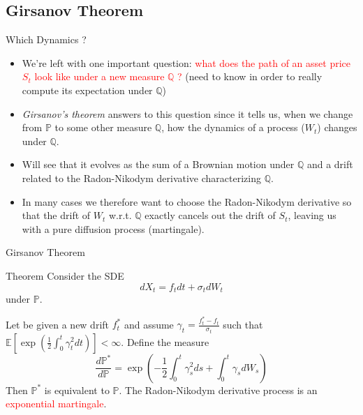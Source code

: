 \documentclass{beamer}
\begin{document}
\subsection{Girsanov Theorem}
\begin{frame}{Which Dynamics ?}
  \begin{itemize}
  \item<1-> We're left with one important question:
    \textcolor{red}{what does the path of an asset price $S_t$ look like under a new measure $\mathbb{Q}$ ?} (need to know in order to really compute its expectation under $\mathbb{Q}$)
  \item<2-> \emph{Girsanov's theorem} answers to this question since it tells us, when we change from $\mathbb{P}$ to some other measure $\mathbb{Q}$, how the dynamics of a process ($W_t$) changes under $\mathbb{Q}$.
  \item<3-> Will see that it evolves as the sum of a Brownian motion under $\mathbb{Q}$ and a drift related to the Radon-Nikodym derivative characterizing $\mathbb{Q}$.
  \item<4-> In many cases we therefore want to choose the Radon-Nikodym derivative so that the drift of $W_t$ w.r.t. $\mathbb{Q}$ exactly cancels out the drift of $S_t$, leaving us with a pure diffusion process (martingale). 
  \end{itemize}
\end{frame}

\begin{frame}{Girsanov Theorem}
  \begin{block}{Theorem}
    Consider the SDE 
    \begin{equation*}
      dX_t = f_t dt + \sigma_t dW_t
    \end{equation*}
    under $\mathbb{P}$. 
    
    Let be given a new drift $f^*_t$ and assume $\gamma_t=\frac{f_t^*-f_t}{\sigma_t}$ such that $\mathbb{E}\left[\exp\left(\frac{1}{2}\int_0^t\gamma_t^2dt\right)\right]<\infty$.
    Define the measure 
    \begin{equation}
      \frac{d\mathbb{P}^*}{d\mathbb{P}}=\exp\left(-\frac{1}{2}\int_0^t \gamma_s^2 ds + \int_0^t \gamma_s dW_s \right)
    \end{equation}
    Then $\mathbb{P}^*$ is equivalent to $\mathbb{P}$. 
    The Radon-Nikodym derivative process is an \textcolor{red}{exponential martingale}.
  \end{block}
\end{frame}
\end{document}
